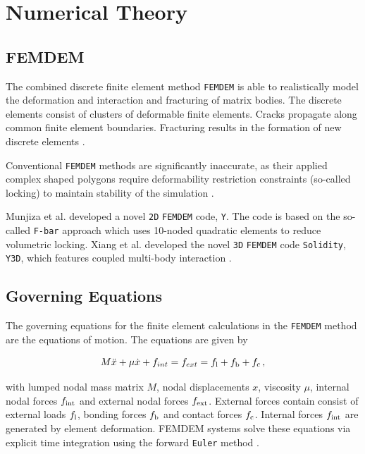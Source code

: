 \documentclass[12pt,twoside]{article}
\theoremstyle{break}
\begin{document}
\section{Numerical Theory}

\subsection{FEMDEM}
The combined discrete finite element method \texttt{FEMDEM} \cite{Wan18, Mun95, Mun99, Mun04, Mun12, Mun13, Guo16, Gao14, Xu14, Che18} is able to realistically model the deformation and interaction and fracturing of matrix bodies. The discrete elements consist of clusters of deformable finite elements. Cracks propagate along common finite element boundaries. Fracturing results in the formation of new discrete elements \cite{Mun13}. 

\bigbreak
Conventional \texttt{FEMDEM} methods are significantly inaccurate, as their applied complex shaped polygons require deformability restriction constraints (so-called locking) to maintain stability of the simulation \cite{Lat15}. 

\bigbreak
Munjiza et al. \cite{Mun13} developed a novel \texttt{2D} \texttt{FEMDEM} code, \texttt{Y}. The code is based on the so-called \texttt{F-bar} approach which uses 10-noded quadratic elements to reduce volumetric locking. Xiang et al. \cite{Xia09} developed the novel \texttt{3D} \texttt{FEMDEM} code \texttt{Solidity}, \texttt{Y3D}, which features coupled multi-body interaction \cite{Lat15}.

\subsection{Governing Equations}
The governing equations for the finite element calculations in the \texttt{FEMDEM} method are the equations of motion. The equations are given by

\begin{equation}
    M\ddot{x}+\mu\dot{x}+f_{int}=f_{ext}=f_{\rm{l}}+f_{\rm{b}}+f_{\rm{c}}\,,
\end{equation}

with lumped nodal mass matrix $M$, nodal displacements $x$, viscosity $\mu$, internal nodal forces $f_{\rm{int}}$ and external nodal forces $f_{\rm{ext}}$. External forces contain consist of external loads $f_{\rm{l}}$, bonding forces $f_{\rm{b}}$ and contact forces $f_{\rm{c}}$. Internal forces $f_{\rm{int}}$ are generated by element deformation. FEMDEM systems solve these equations via explicit time integration using the forward \texttt{Euler} method \cite{Lei16}.
\end{document}
